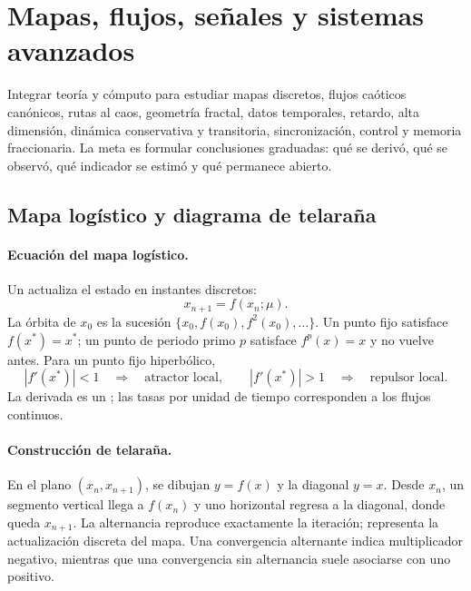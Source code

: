 
\section{Mapas, flujos, señales y sistemas avanzados}

\begin{objectivebox}
Integrar teoría y cómputo para estudiar mapas discretos, flujos caóticos canónicos,
rutas al caos, geometría fractal, datos temporales, retardo, alta dimensión,
dinámica conservativa y transitoria, sincronización, control y memoria fraccionaria.
La meta es formular conclusiones graduadas: qué se derivó, qué se observó, qué
indicador se estimó y qué permanece abierto.
\end{objectivebox}

\subsection{Mapa logístico y diagrama de telaraña}

\paragraph{Ecuación del mapa logístico.}
Un  actualiza el estado en instantes discretos:
\[
 x_{n+1}=f(x_n;\mu).
\]
La órbita de \(x_0\) es la sucesión
\(\{x_0,f(x_0),f^2(x_0),\ldots\}\). Un punto fijo satisface
\(f(x^*)=x^*\); un punto de periodo primo \(p\) satisface
\(f^p(x)=x\) y no vuelve antes. Para un punto fijo hiperbólico,
\[
 |f'(x^*)|<1\quad\Longrightarrow\quad\text{atractor local},\qquad
 |f'(x^*)|>1\quad\Longrightarrow\quad\text{repulsor local}.
\]
La derivada es un ; las tasas por unidad de tiempo corresponden a los flujos continuos.

\paragraph{Construcción de telaraña.}
En el plano \((x_n,x_{n+1})\), se dibujan \(y=f(x)\) y la diagonal \(y=x\).
Desde \(x_n\), un segmento vertical llega a \(f(x_n)\) y uno horizontal regresa a la
diagonal, donde queda \(x_{n+1}\). La alternancia reproduce exactamente la iteración;
representa la actualización discreta del mapa. Una convergencia alternante indica multiplicador negativo,
mientras que una convergencia sin alternancia suele asociarse con uno positivo.

